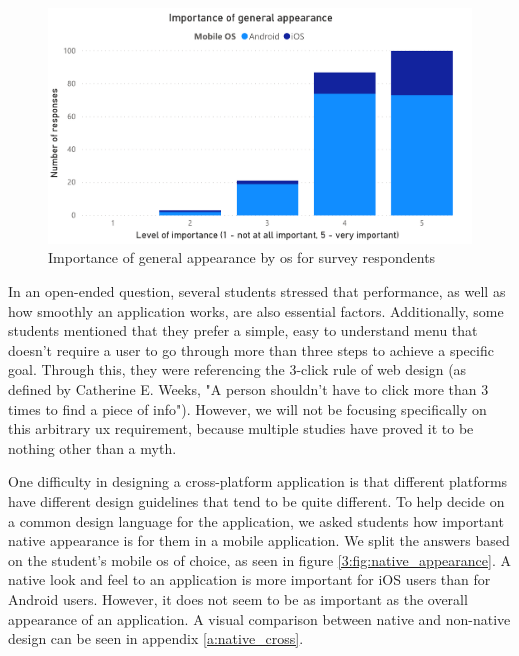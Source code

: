 \begin{figure}[ht]
    \centering
         \includegraphics[width=\textwidth]{figures/charts/survey/appearance.pdf}
    \caption{Importance of general appearance by \acrshort{os} for survey respondents}
    \label{3:fig:appearance}
\end{figure}

In an open-ended question, several students stressed that performance, as well as how smoothly an application works, are also essential factors. Additionally, some students mentioned that they prefer a simple, easy to understand menu that doesn't require a user to go through more than three steps to achieve a specific goal. Through this, they were referencing the 3-click rule of web design (as defined by Catherine E. Weeks\cite{weeks1997design}, "A person shouldn't have to click more than 3 times to find a piece of info"). However, we will not be focusing specifically on this arbitrary \acrshort{ux} requirement, because multiple studies\cite{porter2003testing}\cite{nielsen2006prioritizing} have proved it to be nothing other than a myth.

One difficulty in designing a cross-platform application is that different platforms have different design guidelines that tend to be quite different\cite{thirumala2017interaction}. To help decide on a common design language for the application, we asked students how important native appearance is for them in a mobile application. We split the answers based on the student's mobile \acrshort{os} of choice, as seen in figure \ref{3:fig:native_appearance}. A native look and feel to an application is more important for iOS users than for Android users. However, it does not seem to be as important as the overall appearance of an application. A visual comparison between native and non-native design can be seen in appendix \ref{a:native_cross}.

